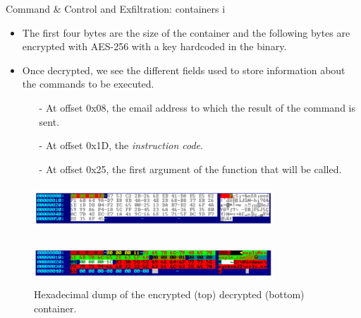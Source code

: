 \begin{frame}[fragile]{Command \& Control and Exfiltration: containers i}
    \begin{itemize}
        \item The first four bytes
        are the size of the container and the following bytes are encrypted with AES-256 with a key hardcoded
        in the binary.
        \item Once decrypted, we see the different fields used to store information about the commands to be executed.
        \begin{itemize}
            \item[-] At offset 0x08, the email address to which the result of the command is sent.
            \item[-] At offset 0x1D, the \emph{instruction code}.
            \item[-] At offset 0x25, the first argument of the function that will be called.
        \end{itemize}
    \end{itemize}
    \begin{figure}
        \includegraphics[height=1.6cm, width=9cm]{figures/encr_dump.PNG}
    \end{figure}
    \begin{figure}
        \includegraphics[height=1.6cm, width=9cm]{figures/decr_dump.PNG}
        \caption{Hexadecimal dump of the encrypted (top) decrypted (bottom) container.}
    \end{figure}
\end{frame}


